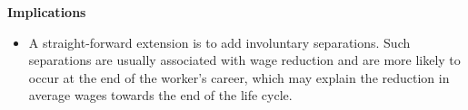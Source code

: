 \begin{frame}\textbf{Implications}\vspace{0.3cm}

\begin{itemize}\setlength\itemsep{1em}
\item A straight-forward extension is to add involuntary separations. Such separations are usually associated with wage reduction and are more likely to occur at the end of the worker's career, which may explain the reduction in average wages towards the end of the life cycle.
\end{itemize}

\end{frame}
